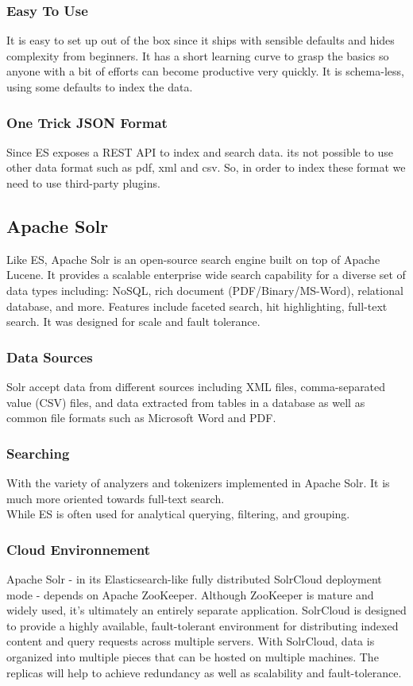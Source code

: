 \subsubsection{Easy To Use}
It is easy to set up out of the box since it ships with sensible defaults and hides complexity from beginners. 
It has a short learning curve to grasp the basics so anyone with a bit of efforts can become productive very quickly. It is schema-less, using some defaults to index the data.

\subsubsection{One Trick JSON Format}
Since ES exposes a REST API to index and search data. its not possible to use other data format such as pdf, xml and csv. So, in order to index these format
we need to use third-party plugins.

\subsection{Apache Solr}
Like ES, Apache Solr is an open-source search engine built on top of Apache Lucene. It provides a scalable enterprise wide search capability for a diverse set of data types including: NoSQL, rich document (PDF/Binary/MS-Word), relational database, and more. Features include faceted search, hit highlighting, full-text search. It was designed for scale and fault tolerance.

\subsubsection{Data Sources}
Solr accept data from different sources including XML files, comma-separated value (CSV) files, and data extracted from tables in a database as well as common file formats such as Microsoft Word and PDF.

\subsubsection{Searching}
With the variety of analyzers and tokenizers implemented in Apache Solr. It is much more oriented towards full-text search.\\
While ES is often used for analytical querying, filtering, and grouping.

\subsubsection{Cloud Environnement}
Apache Solr - in its Elasticsearch-like fully distributed SolrCloud deployment mode - depends on Apache ZooKeeper. 
Although ZooKeeper is mature and widely used, it’s ultimately an entirely separate application. SolrCloud is designed to provide a highly available, fault-tolerant environment for distributing indexed content and query requests across multiple servers. With SolrCloud, data is organized into multiple pieces that can be hosted on multiple machines. The replicas will help to achieve redundancy as well as scalability and fault-tolerance.

